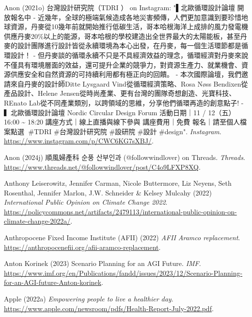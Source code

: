 \documentclass[
  letterpaper,
  DIV=11,
  numbers=noendperiod]{scrartcl}
\newlength{\cslhangindent}
\newenvironment{CSLReferences}[2] %
 {\begin{list}{}{%
  \setlength{\itemindent}{0pt}
  \setlength{\leftmargin}{0pt}
  \setlength{\parsep}{0pt}
  \ifodd #1
   \setlength{\leftmargin}{\cslhangindent}
   \setlength{\itemindent}{-1\cslhangindent}
  \fi
  \setlength{\itemsep}{#2\baselineskip}}}
 {\end{list}}
\begin{document}
\begin{CSLReferences}{0}{1}
Anon (2021o) 台灣設計研究院（{TDRI} ） on {Instagram}:
"▌北歐循環設計論壇 {\textbar} 開放報名中 -
近幾年，全球的極端氣候造成各地災害頻傳，人們更加意識到要珍惜地球資源，丹麥從10幾年前就開始推行低碳生活，哥本哈根海洋上成排的風力發電機供應丹麥20\%以上的能源，哥本哈根的學校建造出全世界最大的太陽能板，甚至丹麥的設計團隊進行設計皆從永續環境為本心出發，在丹麥，每一個生活環節都是循環設計！
-
但丹麥談的循環永續不只是不具經濟效益的理念，循環經濟對丹麥來說不僅具有環境層面的效益，還可提升企業的競爭力，對資源生產力、就業機會、資源供應安全和自然資源的可持續利用都有極正向的回饋。
- 本次國際論壇，{我們邀請來自丹麥的設計師Ditte Lysgaard
Vind從循環經濟策略}、{Rosa N{ø}ss Bendixen從產品設計}、{Helene
Jensen從時尚產業}、更有台灣的團隊奇想創造、光寶科技、{REnato}
Lab從不同產業類別，以跨領域的思維，分享他們循環再造的創意點子! -
▍北歐循環設計論壇 {Nordic Circular Design Forum} 活動日期｜11 /
12（五）16:00 {\textasciitilde{}} 18:20 講座方式｜線上直播與線下參與
講座費用｜免費 報名｜請至個人檔案點選🔗 \#{TDRI} \#台灣設計研究院
\#設研院 \#設計 \#design". \emph{Instagram}.
\url{https://www.instagram.com/p/CWC6KG7sXBJ/}.

Anon (2024j) 順風婦產科 순풍 산부인과 (@followwindlover) on {Threads}.
\emph{Threads}.
\url{https://www.threads.net/@followwindlover/post/C4o9LFXP8XQ}.

Anthony Leiserowitz, Jennifer Carman, Nicole Buttermore, Liz Neyens,
Seth Rosenthal, Jennifer Marlon, J.W. Schneider \& Kelsey Mulcahy (2022)
\emph{International {Public Opinion} on {Climate Change} 2022}.
\url{https://policycommons.net/artifacts/2479113/international-public-opinion-on-climate-change-2022a/}.

Anthropocene Fixed Income Institute (AFII) (2022) \emph{{AFII Aramco}
replacement}. \url{https://anthropocenefii.org/afii-aramco-replacement}.

Anton Korinek (2023) Scenario {Planning} for an {AGI Future}.
\emph{IMF}.
\url{https://www.imf.org/en/Publications/fandd/issues/2023/12/Scenario-Planning-for-an-AGI-future-Anton-korinek}.

Apple (2022a) \emph{Empowering people to live a healthier day}.
\url{https://www.apple.com/newsroom/pdfs/Health-Report-July-2022.pdf}.


\end{CSLReferences}
\end{document}
